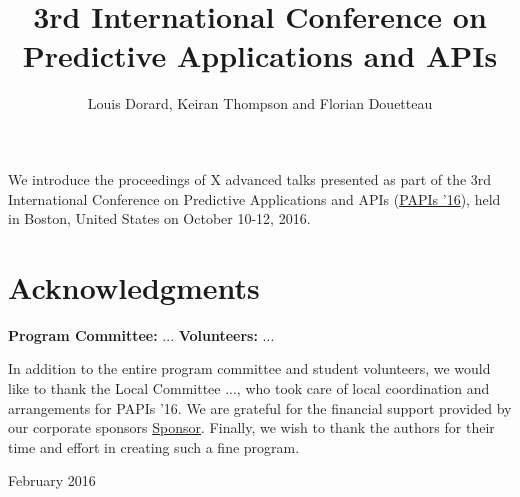 \documentclass[wcp]{jmlrbook}
\title[PAPIs 2016]{3rd International Conference on Predictive Applications and APIs}
\author{Louis Dorard, Keiran Thompson and Florian Douetteau}
\subtitle{\thejmlrworkshop}
\begin{document}
\maketitle

\frontmatter

\begin{preface}

	We introduce the proceedings of X advanced talks presented as part of the 3rd International Conference on Predictive Applications and APIs (\href{http://papis.io/2016}{PAPIs '16}), held in Boston, United States on October 10-12, 2016.

  \section*{Acknowledgments}

  \textbf{Program Committee:}
  ...
  \textbf{Volunteers:}
  ...

  In addition to the entire program committee and student volunteers, we would like to thank the Local Committee ..., who took care of local coordination and arrangements for PAPIs '16.
  We are grateful for the financial support provided by our corporate sponsors \href{http://sponsor.com}{Sponsor}.
  Finally, we wish to thank the authors for their time and effort in creating such a fine program.

\begin{signoff}{February 2016}
\end{signoff}


\end{preface}

\tableofcontents

\mainmatter

\begin{jmlrpapers}
\end{jmlrpapers}
\end{document}
